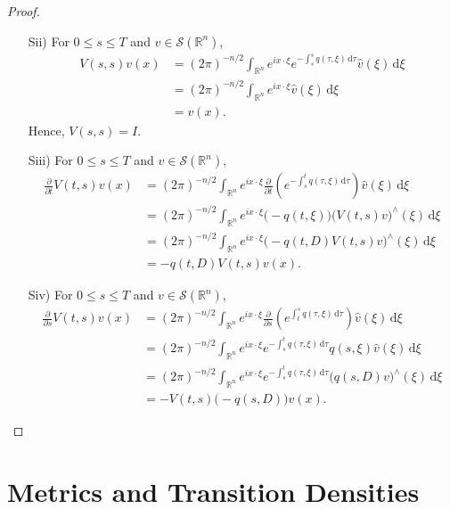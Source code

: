 \documentclass[a4paper, 12pt]{report}
\theoremstyle{cor}
\theoremstyle{remark}
\theoremstyle{definition}
\begin{document}
\begin{proof}
\begin{itemize}
\item[Sii)] For $0 \le s \le T$ and $v \in \mathcal{S}(\mathbb{R}^n)$,
\begin{align}
V(s, s)v(x) & = (2\pi)^{-n/2}\int_{\mathbb{R}^n}e^{ix\cdot\xi}e^{-\int_s^sq(\tau, \xi)\,\mathrm{d}\tau}\hat{v}(\xi)\,\mathrm{d}\xi\nonumber\\
& = (2\pi)^{-n/2}\int_{\mathbb{R}^n}e^{ix\cdot\xi}\hat{v}(\xi)\,\mathrm{d}\xi\nonumber\\
& = v(x).\nonumber
\end{align}
Hence, $V(s, s) = I$.

\item[Siii)] For $0 \le s \le T$ and $v \in \mathcal{S}(\mathbb{R}^n)$,
\begin{align}
\frac{\partial}{\partial t}V(t, s)v(x) & = (2\pi)^{-n/2}\int_{\mathbb{R}^n}e^{ix\cdot\xi}\frac{\partial}{\partial t}\left(e^{-\int_s^tq(\tau, \xi)\,\mathrm{d}\tau}\right)\hat{v}(\xi)\,\mathrm{d}\xi\nonumber\\
& = (2\pi)^{-n/2}\int_{\mathbb{R}^n}e^{ix\cdot\xi}\big(-q(t, \xi)\big)\big(V(t, s)v\big)^\wedge(\xi)\,\mathrm{d}\xi\nonumber\\
& = (2\pi)^{-n/2}\int_{\mathbb{R}^n}e^{ix\cdot\xi}\big(-q(t, D)V(t, s)v\big)^\wedge(\xi)\,\mathrm{d}\xi\nonumber\\
& = -q(t, D)V(t, s)v(x)\nonumber.
\end{align}

\item[Siv)] For $0 \le s \le T$ and $v \in \mathcal{S}(\mathbb{R}^n)$,
\begin{align}
\frac{\partial}{\partial s}V(t, s)v(x) & = (2\pi)^{-n/2}\int_{\mathbb{R}^n}e^{ix\cdot\xi}\frac{\partial}{\partial s}\left(e^{\int_t^sq(\tau, \xi)\,\mathrm{d}\tau}\right)\hat{v}(\xi)\,\mathrm{d}\xi\nonumber\\
& = (2\pi)^{-n/2}\int_{\mathbb{R}^n}e^{ix\cdot\xi}e^{-\int_s^tq(\tau, \xi)\,\mathrm{d}\tau}q(s, \xi)\hat{v}(\xi)\,\mathrm{d}\xi\nonumber\\
& = (2\pi)^{-n/2}\int_{\mathbb{R}^n}e^{ix\cdot\xi}e^{-\int_s^tq(\tau, \xi)\,\mathrm{d}\tau}\big(q(s, D)v\big)^\wedge(\xi)\,\mathrm{d}\xi\nonumber\\
& = -V(t, s)\big(-q(s, D)\big)v(x)\nonumber.
\end{align}

\end{itemize}
\end{proof}

\newpage

\section{Metrics and Transition Densities}\label{Se.MaTD}
\end{document}
